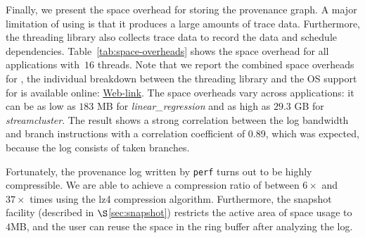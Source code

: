 Finally, we present the space overhead for storing the provenance graph. A major limitation of using \intelpt is that it produces a large amounts of trace data. Furthermore, the threading library also collects trace data to record the data and schedule dependencies.  Table~\ref{tab:space-overheads} shows the space overhead for all applications with~$16$ threads. Note that we report the combined space overheads for \projecttitle, the individual breakdown between the threading library and the OS support for \intelpt is available online:  \href{https://mic92.github.io/inspector/index.html\#measurement_table}{Web-link}. The space overheads vary across applications: it can be as low as $183$ MB for {\em linear\_regression} and as high as $29.3$ GB for {\em streamcluster}. The result shows a strong correlation between the log bandwidth and branch instructions with a correlation coefficient of 0.89, which was expected, because the
log consists of taken branches.

Fortunately,  the provenance log written by {\tt perf} turns out to be highly compressible. We
are able to achieve a compression ratio of between $6\times$ and $37\times$ times using the lz4 compression algorithm. 
Furthermore, the snapshot facility (described in $\S$\ref{sec:snapshot}) restricts the active area of space usage to $4$MB, and the user can reuse the space in the ring buffer after analyzing the log.







